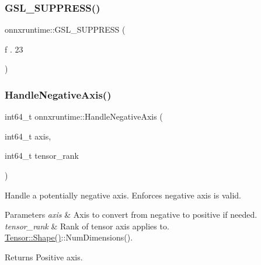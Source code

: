 \mbox{\label{namespaceonnxruntime_a55b92eaf2da89b6eefb149bb6dbba21d}} 
\subsubsection{\texorpdfstring{G\+S\+L\+\_\+\+S\+U\+P\+P\+R\+E\+S\+S()}{GSL\_SUPPRESS()}\hspace{0.1cm}{\footnotesize\ttfamily [3/3]}}
{\footnotesize\ttfamily onnxruntime\+::\+G\+S\+L\+\_\+\+S\+U\+P\+P\+R\+E\+SS (\begin{DoxyParamCaption}\item[{f .}]{23 }\end{DoxyParamCaption})}

\mbox{\label{namespaceonnxruntime_ad823cea46f068feefa2aa8f3cfb310f1}} 
\subsubsection{\texorpdfstring{Handle\+Negative\+Axis()}{HandleNegativeAxis()}}
{\footnotesize\ttfamily int64\+\_\+t onnxruntime\+::\+Handle\+Negative\+Axis (\begin{DoxyParamCaption}\item[{int64\+\_\+t}]{axis,  }\item[{int64\+\_\+t}]{tensor\+\_\+rank }\end{DoxyParamCaption})\hspace{0.3cm}{\ttfamily [inline]}}

Handle a potentially negative axis. Enforces negative axis is valid. 
\begin{DoxyParams}{Parameters}
{\em axis} & Axis to convert from negative to positive if needed. \\
\hline
{\em tensor\+\_\+rank} & Rank of tensor axis applies to. \mbox{\hyperlink{classonnxruntime_1_1Tensor_a35f659dde537304b2492b7c0bec8a7b4}{Tensor\+::\+Shape()}}\+::\+Num\+Dimensions(). \\
\hline
\end{DoxyParams}
\begin{DoxyReturn}{Returns}
Positive axis. 
\end{DoxyReturn}
\mbox{\label{namespaceonnxruntime_a8cd33aa591de91e90770d34bd0dabdf9}} 
